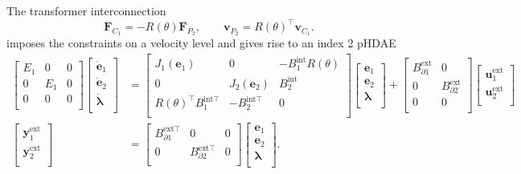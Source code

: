 The transformer interconnection
\begin{equation*}
\bm{F}_{C_1} = -R(\theta) \bm{F}_{P_2}, \qquad
\bm{v}_{P_2} = R(\theta)^\top \bm{v}_{C_1}.
\end{equation*}
imposes the constraints on a velocity level and gives rise to an index 2 pHDAE
\begin{align*}
\begin{bmatrix}
E_1 & 0 & 0 \\ 
0 & E_1 & 0 \\
0 & 0 & 0 \\
\end{bmatrix}
\begin{bmatrix}
\dot{\bm{e}}_1 \\ \dot{\bm{e}}_2 \\ \dot{\bm{\lambda}} \\
\end{bmatrix} &= 
\begin{bmatrix}
J_1(\bm{e}_1) & 0 & -B_1^{\text{int}} R(\theta) \\ 
0 & J_2(\bm{e}_2) & B_2^{\text{int}} \\
R(\theta)^\top B_1^{\text{int} \top} & - B_2^{\text{int} \top} & 0 \\
\end{bmatrix}
\begin{bmatrix}
\bm{e}_1  \\ 
\bm{e}_2  \\ 
\bm{\lambda} \\
\end{bmatrix}+ 
\begin{bmatrix}
B_{\partial 1}^{\text{ext}} & 0 \\ 0 & B_{\partial 2}^{\text{ext}} \\ 0 & 0 \\
\end{bmatrix} 
\begin{bmatrix}
\bm{u}_1^{\text{ext}} \\ 
\bm{u}_2^{\text{ext}} \\
\end{bmatrix} \\
\begin{bmatrix}
\bm{y}_1^{\text{ext}} \\ \bm{y}_2^{\text{ext}} \\
\end{bmatrix}  &= \begin{bmatrix}
B_{\partial 1}^{\text{ext} \top} & 0 & 0 \\
0 & B_{\partial 2}^{\text{ext} \top} & 0 \\
\end{bmatrix} \begin{bmatrix}
\bm{e}_1  \\ 
\bm{e}_2  \\ 
\bm{\lambda} \\
\end{bmatrix}.
\end{align*}




